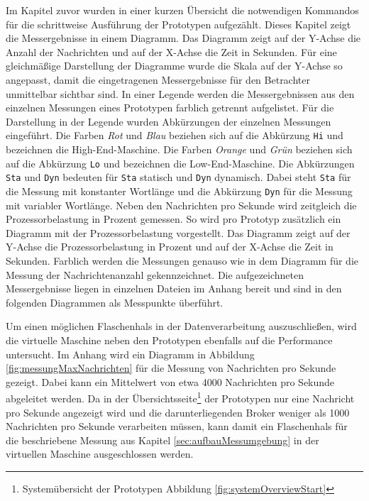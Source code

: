 Im Kapitel zuvor wurden in einer kurzen Übersicht die notwendigen Kommandos für die schrittweise Ausführung der Prototypen aufgezählt. Dieses Kapitel zeigt die Messergebnisse in einem Diagramm. Das Diagramm zeigt auf der Y-Achse die Anzahl der Nachrichten und auf der X-Achse die Zeit in Sekunden. Für eine gleichmäßige Darstellung der Diagramme wurde die Skala auf der Y-Achse so angepasst, damit die eingetragenen Messergebnisse für den Betrachter unmittelbar sichtbar sind. In einer Legende werden die Messergebnissen aus den einzelnen Messungen eines Prototypen farblich getrennt aufgelistet. Für die Darstellung in der Legende wurden Abkürzungen der einzelnen Messungen eingeführt. Die Farben \textit{Rot} und \textit{Blau} beziehen sich auf die Abkürzung \texttt{Hi} und bezeichnen die High-End-Maschine. Die Farben \textit{Orange} und \textit{Grün} beziehen sich auf die Abkürzung \texttt{Lo} und bezeichnen die Low-End-Maschine. Die Abkürzungen \texttt{Sta} und \texttt{Dyn} bedeuten für \texttt{Sta} statisch und \texttt{Dyn} dynamisch. Dabei steht \texttt{Sta} für die Messung mit konstanter Wortlänge und die Abkürzung \texttt{Dyn} für die Messung mit variabler Wortlänge. Neben den Nachrichten pro Sekunde wird zeitgleich die Prozessorbelastung in Prozent gemessen. So wird pro Prototyp zusätzlich ein Diagramm mit der Prozessorbelastung vorgestellt. Das Diagramm zeigt auf der Y-Achse die Prozessorbelastung in Prozent und auf der X-Achse die Zeit in Sekunden. Farblich werden die Messungen genauso wie in dem Diagramm für die Messung der Nachrichtenanzahl gekennzeichnet. Die aufgezeichneten Messergebnisse liegen in einzelnen Dateien im Anhang bereit und sind in den folgenden Diagrammen als Messpunkte überführt.

Um einen möglichen Flaschenhals in der Datenverarbeitung auszuschließen, wird die virtuelle Maschine neben den Prototypen ebenfalls auf die Performance untersucht. Im Anhang wird ein Diagramm in Abbildung \ref{fig:messungMaxNachrichten} für die Messung von Nachrichten pro Sekunde gezeigt. Dabei kann ein Mittelwert von etwa 4000 Nachrichten pro Sekunde abgeleitet werden. Da in der Übersichtsseite\footnote{Systemübersicht der Prototypen Abbildung \ref{fig:systemOverviewStart}} der Prototypen nur eine Nachricht pro Sekunde angezeigt wird und die darunterliegenden Broker weniger als 1000 Nachrichten pro Sekunde verarbeiten müssen, kann damit ein Flaschenhals für die beschriebene Messung aus Kapitel \ref{sec:aufbauMessumgebung} in der virtuellen Maschine  ausgeschlossen werden. 

